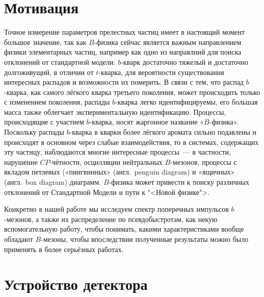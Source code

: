 \documentclass[12pt]{kiarticle}
\begin{document}
%	
	
	
	
\section{Мотивация}

	Точное измерение параметров прелестных частиц имеет в настоящий момент большое значение, так как $ B $-физика сейчас является важным направлением физики элементарных частиц, например как одно из направлний для поиска отклонений от стандартной модели. $ b $-кварк достаточно тяжелый и достаточно долгоживущий, в отличии от $ t $-кварка, для вероятности существования интересных распадов и возможности их померить.
	В связи с тем, что распад $ b $-кварка, как самого лёгкого кварка третьего поколения, может происходить только с изменением поколения, распады $ b $-кварка легко идентифицируемы, его большая масса также облегчает экспериментальную идентификацию.
	Процессы, происходящие с участием $ b $-кварка, носят жаргонное название «$ B $-физика». Поскольку распады $ b $-кварка в кварки более лёгкого аромата сильно подавлены и происходят в основном через слабые взаимодействия, то в системах, содержащих эту частицу, наблюдаются многие интересные процессы — в частности, нарушение $ CP $-чётности, осцилляции нейтральных $ B $-мезонов, процессы с вкладом петлевых («пингвинных» (англ. penguin diagram) и «ящичных» (англ. box diagram) диаграмм. $ B $-физика может привести к поиску различных отклонений от Стандартной Модели и пути к "<Новой физике">.
	
	Конкретно в нашей работе мы исследуем спектр поперечных импульсов $ b $-мезонов, а также их распределение по псевдобыстротам, как некую вспомогательную работу, чтобы понимать, какими характеристиками вообще обладают $ B $-мезоны, чтобы впоследствии полученные результаты можно было применять в более серьёзных работах.  
	
\section{Устройство детектора}
\end{document}

